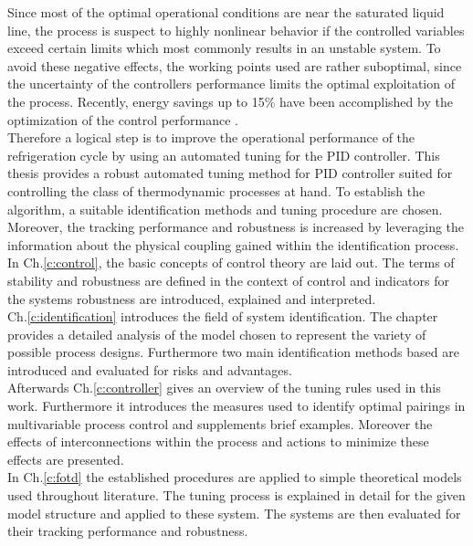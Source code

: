 Since most of the optimal operational conditions are near the saturated liquid line, the process is suspect to highly nonlinear behavior if the controlled variables exceed certain limits which most commonly results in an unstable system. To avoid these negative effects, the working points used are rather suboptimal, since the uncertainty of the controllers performance limits the optimal exploitation of the process. Recently, energy savings up to 15\% have been accomplished by the optimization of the control performance \cite{ATMOSPHERE}.\\

Therefore a logical step is to improve the operational performance of the refrigeration cycle by using an automated tuning for the PID controller. This thesis provides a robust automated tuning method for PID controller suited for controlling the class of thermodynamic processes at hand. To establish the algorithm, a suitable identification methods and tuning procedure are chosen. Moreover, the tracking performance and robustness is increased by leveraging the information about the physical coupling gained within the identification process.\\

In Ch.\ref{c:control}, the basic concepts of control theory are laid out. The terms of stability and robustness are defined in the context of control and indicators for the systems robustness are introduced, explained and interpreted.\\

Ch.\ref{c:identification} introduces the field of system identification. The chapter provides a detailed analysis of the model chosen to represent the variety of possible process designs. Furthermore two main identification methods based are introduced and evaluated for risks and advantages.\\

Afterwards Ch.\ref{c:controller} gives an overview of the tuning rules used in this work. Furthermore it introduces the measures used to identify optimal pairings in multivariable process control and supplements brief examples. Moreover the effects of interconnections within the process and actions to minimize these effects are presented.\\

In Ch.\ref{c:fotd} the established procedures are applied to simple theoretical models used throughout literature. The tuning process is explained in detail for the given model structure and applied to these system. The systems are then evaluated for their tracking performance and robustness.\\

